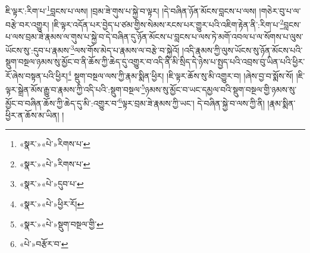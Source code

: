 ཇི་ལྟར་:རིག་པ་\footnote{«སྣར་»«པེ་»རིགས་པ་}བླངས་པ་ལས། །བྲམ་ཟེ་གུས་པ་སྐྱེ་བ་ལྟར། །དེ་བཞིན་ཉོན་མོངས་བླངས་པ་ལས། །གཅེར་བུ་པ་ལ་བརྩེ་བར་འགྱུར། །ཇི་ལྟར་འདོན་པར་བྱེད་པ་ཙམ་གྱིས་སེམས་རངས་པར་གྱུར་པའི་འཇིག་རྟེན་ནི་:རིག་པ་\footnote{«སྣར་»«པེ་»རིགས་པ་}བླངས་པ་ལས་བྲམ་ཟེ་རྣམས་ལ་གུས་པ་སྐྱེ་བ་དེ་བཞིན་དུ་ཉོན་མོངས་པ་བླངས་པ་ལས་ཏེ་མགོ་འབལ་པ་ལ་སོགས་པ་ལུས་ཡོངས་སུ་:དུབ་པ་རྣམས་\footnote{«སྣར་»«པེ་»དུབ་པ་}ལས་གོས་མེད་པ་རྣམས་ལ་བརྩེ་བ་སྐྱེའོ། །འདི་རྣམས་ཀྱི་ལུས་ཡོངས་སུ་ཉོན་མོངས་པའི་སྡུག་བསྔལ་ཉམས་སུ་མྱོང་བ་ནི་ཆོས་ཀྱི་ཆེད་དུ་འགྱུར་བ་འདི་ནི་མི་སྲིད་དེ་ཉེས་པ་སྤྱད་པའི་འབྲས་བུ་ཡིན་པའི་ཕྱིར་རོ་ཞེས་བསྟན་པའི་ཕྱིར།\footnote{«སྣར་»«པེ་»ཕྱིར་རོ།} སྡུག་བསྔལ་ལས་ཀྱི་རྣམ་སྨིན་ཕྱིར། །ཇི་ལྟར་ཆོས་སུ་མི་འགྱུར་བ། །ཞེས་བྱ་བ་སྨོས་སོ། །ཇི་ལྟར་སྒྲེན་མོས་རྒྱུ་བ་རྣམས་ཀྱི་འདི་པའི་:སྡུག་བསྔལ་\footnote{«སྣར་»«པེ་»སྡུག་བསྔལ་གྱི་}ཉམས་སུ་མྱོང་བ་ཡང་དམྱལ་བའི་སྡུག་བསྔལ་གྱི་ཉམས་སུ་མྱོང་བ་བཞིན་ཆོས་ཀྱི་ཆེད་དུ་མི་:འགྱུར་བ་\footnote{«པེ་»བརྩོར་བ་}ལྟར་བྲམ་ཟེ་རྣམས་ཀྱི་ཡང་། དེ་བཞིན་སྐྱེ་བ་ལས་ཀྱི་ནི། །རྣམ་སྨིན་ཕྱིར་ན་ཆོས་མ་ཡིན། །
